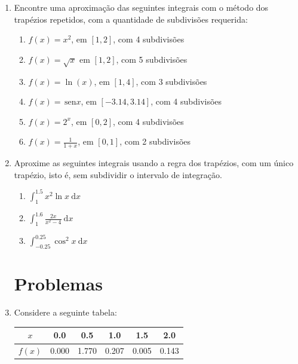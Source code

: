 \documentclass[a4paper]{article}
\providecommand{\sin}{} \renewcommand{\sin}{\hspace{2pt}\mathrm{sen}}
\newcommand{\ud}{\mathrm{\ d}}
\begin{document}
\begin{enumerate}
\item Encontre uma aproximação das seguintes integrais com o método
  dos trapézios repetidos, com a quantidade de subdivisões requerida:
  \begin{enumerate}
  \item $f(x)= x^2$, em $[1,2]$, com 4 subdivisões 
  \item $f(x) = \sqrt{x}$ em $[1,2]$, com 5 subdivisões
  \item $f(x) = \ln(x)$, em $[1,4]$, com 3 subdivisões
  \item $f(x) = \sin x$, em $[-3.14,3.14]$, com 4 subdivisões
  \item $f(x) = 2^x$, em $[0,2]$, com 4 subdivisões
  \item $f(x) = \frac{1}{1+x}$, em $[0,1]$, com 2 subdivisões
  \end{enumerate}

\item Aproxime as seguintes integrais usando a regra dos trapézios,
  com um único trapézio, isto é, sem subdividir o intervalo de
  integração.
  \begin{enumerate}
  \item $\int_1^{1.5}x^2\ln x \ud x$
  \item $\int_{1}^{1.6} \frac{2x}{x^2-4}\ud x$
  \item $\int_{-0.25}^{0.25}\cos ^2 x \ud x$
  \end{enumerate}

\section{Problemas}
\item Considere a seguinte tabela:

  \begin{tabular}{c|ccccc}
    $x$ & 0.0 & 0.5 & 1.0 & 1.5 & 2.0\\
    \hline
    $f(x)$ & 0.000 & 1.770 & 0.207 & 0.005 & 0.143 \\ 
  \end{tabular}


\end{enumerate}
\end{document}
